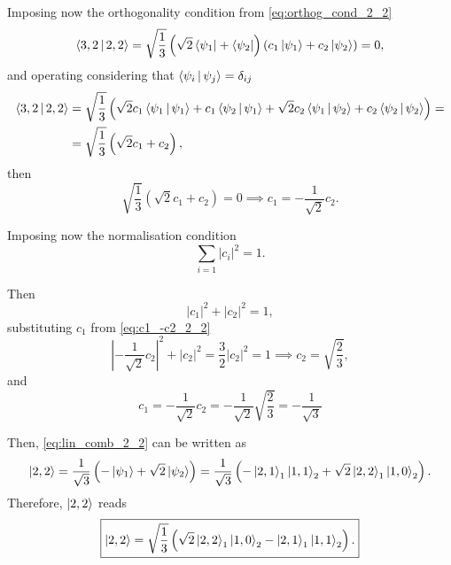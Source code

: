 Imposing now the orthogonality condition from \cref{eq:orthog_cond_2_2}
\begin{equation}
    \Braket{3,2 | 2,2} = 
    \sqrt{\frac{1}{3}} \left( \sqrt{2} \Bra{\psi_1} + \Bra{\psi_2} \right)
    \left( c_1 \Ket{\psi_1} + c_2 \Ket{\psi_2} \right)
    = 0,
\end{equation}
and operating considering that $\Braket{\psi_i | \psi_j} = \delta_{ij}$
\begin{align}
    \notag \Braket{3,2 | 2,2} &= 
    \sqrt{\frac{1}{3}} \left( 
          \sqrt{2} c_1 \Braket{\psi_1 | \psi_1}
                 + c_1 \Braket{\psi_2 | \psi_1}
        + \sqrt{2} c_2 \Braket{\psi_1 | \psi_2}
                 + c_2 \Braket{\psi_2 | \psi_2}
    \right) = \\
                              &= \sqrt{\frac{1}{3}} \left( \sqrt{2} c_1 + c_2 \right),
\end{align}
then 
\begin{equation}\label{eq:c1_-c2_2_2}
    \sqrt{\frac{1}{3}} \left( \sqrt{2} c_1 + c_2 \right) = 0 
    \implies
    c_1 = - \frac{1}{\sqrt{2}} c_2.
\end{equation}

Imposing now the normalisation condition 
\begin{equation}\label{eq:normalisation_condition}
    \sum_{i=1} \left| c_i \right|^2 = 1.
\end{equation}

Then 
\begin{equation}
    \left| c_1 \right|^2 + \left| c_2 \right|^2 = 1,
\end{equation}
substituting $c_1$ from \cref{eq:c1_-c2_2_2} 
\begin{equation}
    \left| - \frac{1}{\sqrt{2}} c_2 \right|^2 + \left| c_2 \right|^2 = \frac{3}{2} \left| c_2 \right|^2 = 1
    \implies 
    c_2 = \sqrt{\frac{2}{3}},
\end{equation}
and 
\begin{equation}
    c_1 = - \frac{1}{\sqrt{2}} c_2
        = - \frac{1}{\sqrt{2}} \sqrt{\frac{2}{3}}
        = - \frac{1}{\sqrt{3}}
\end{equation}

Then, \cref{eq:lin_comb_2_2} can be written as
\begin{equation}
    \Ket{2,2} =
    \frac{1}{\sqrt{3}} \left( - \Ket{\psi_1} + \sqrt{2} \Ket{\psi_2} \right) =
    \frac{1}{\sqrt{3}} \left( - \Ket{2,1}_1 \Ket{1,1}_2 + \sqrt{2} \Ket{2,2}_1 \Ket{1,0}_2 \right).
\end{equation}
Therefore, $\Ket{2,2}$ reads
\begin{equation}\label{eq:ket_2_2}
    \boxed{
    \Ket{2,2} =
    \sqrt{\frac{1}{3}} \left( \sqrt{2} \Ket{2,2}_1 \Ket{1,0}_2 - \Ket{2,1}_1 \Ket{1,1}_2 \right).
    }
\end{equation}

